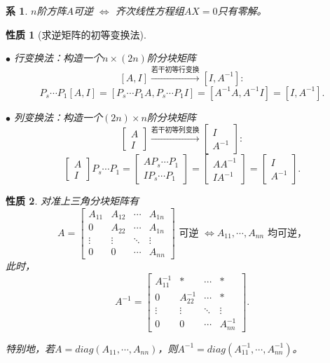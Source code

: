 \documentclass[a4paper]{book}
\newtheorem{prop}{性质}[chapter]
\newtheorem{cor}{系}[chapter]
\newcommand{\enum}{\begin{list}{}{\setlength{\leftmargin}{0pt} \setlength{\itemindent}{2.5em} \setlength{\listparindent}{2em}}}
\begin{document}
\begin{cor}
$n$阶方阵$A$可逆 $\Longleftrightarrow$ 齐次线性方程组$AX=0$只有零解。
\end{cor}

\begin{prop}[求逆矩阵的初等变换法]\

\enum
\item[$\bullet$] 行变换法：构造一个$n\times(2n)$阶分块矩阵
$$[A,I] \xrightarrow{\text{若干初等行变换}} [I,A^{-1}]:$$
$$P_s\cdots P_1[A,I] = [P_s\cdots P_1A, P_s\cdots P_1I] = [A^{-1}A,A^{-1}I] = [I,A^{-1}].$$
\item[$\bullet$] 列变换法：构造一个$(2n)\times n$阶分块矩阵
$$\begin{bmatrix} A \\ I \end{bmatrix} \xrightarrow{\text{若干初等列变换}} \begin{bmatrix} I \\ A^{-1} \end{bmatrix}:$$
$$\begin{bmatrix} A \\ I \end{bmatrix}P_s\cdots P_1 = \begin{bmatrix} AP_s\cdots P_1 \\ IP_s\cdots P_1 \end{bmatrix} = \begin{bmatrix} AA^{-1} \\ IA^{-1} \end{bmatrix} = \begin{bmatrix} I \\ A^{-1} \end{bmatrix}.$$
\end{list}
\end{prop}

\begin{prop}
对准上三角分块矩阵有
$$A = \begin{bmatrix} A_{11} & A_{12} & \cdots & A_{1n} \\ 0 & A_{22} & \cdots & A_{1n} \\ \vdots & \vdots & \ddots & \vdots \\ 0 & 0 & \cdots & A_{nn} \end{bmatrix} \text{ 可逆 }
\Longleftrightarrow  A_{11},\cdots,A_{nn}\text{ 均可逆，}$$
此时，
$$A^{-1} = \begin{bmatrix} A_{11}^{-1} & \ast & \cdots & \ast \\ 0 & A_{22}^{-1} & \cdots & \ast \\ \vdots & \vdots & \ddots & \vdots \\ 0 & 0 & \cdots & A_{nn}^{-1} \end{bmatrix}.$$

特别地，若$A = diag(A_{11},\cdots,A_{nn})$，则$A^{-1} = diag(A_{11}^{-1},\cdots,A_{nn}^{-1})$。
\end{prop}
\end{document}
